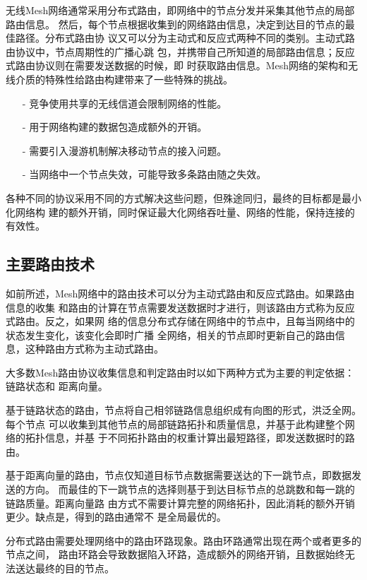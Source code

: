 无线Mesh网络通常采用分布式路由，即网络中的节点分发并采集其他节点的局部路由信息。
然后，每个节点根据收集到的网络路由信息，决定到达目的节点的最佳路径。分布式路由协
议又可以分为主动式和反应式两种不同的类别。主动式路由协议中，节点周期性的广播心跳
包，并携带自己所知道的局部路由信息；反应式路由协议则在需要发送数据的时候，即
时获取路由信息。Mesh网络的架构和无线介质的特殊性给路由构建带来了一些特殊的挑战。

\begin{itemize}
  \item[-] 竞争使用共享的无线信道会限制网络的性能。
  \item[-] 用于网络构建的数据包造成额外的开销。
  \item[-] 需要引入漫游机制解决移动节点的接入问题。
  \item[-] 当网络中一个节点失效，可能导致多条路由随之失效。
\end{itemize}

各种不同的协议采用不同的方式解决这些问题，但殊途同归，最终的目标都是最小化网络构
建的额外开销，同时保证最大化网络吞吐量、网络的性能，保持连接的有效性。

\subsection{主要路由技术}
\label{sec:2.2}
如前所述，Mesh网络中的路由技术可以分为主动式路由和反应式路由。如果路由信息的收集
和路由的计算在节点需要发送数据时才进行，则该路由方式称为反应式路由。反之，如果网
络的信息分布式存储在网络中的节点中，且每当网络中的状态发生变化，该变化会即时广播
全网络，相关的节点即时更新自己的路由信息，这种路由方式称为主动式路由。

大多数Mesh路由协议收集信息和判定路由时以如下两种方式为主要的判定依据：链路状态和
距离向量。

基于链路状态的路由，节点将自己相邻链路信息组织成有向图的形式，洪泛全网。每个节点
可以收集到其他节点的局部链路拓扑和质量信息，并基于此构建整个网络的拓扑信息，并基
于不同拓扑路由的权重计算出最短路径，即发送数据时的路由。

基于距离向量的路由，节点仅知道目标节点数据需要送达的下一跳节点，即数据发送的方向。
而最佳的下一跳节点的选择则基于到达目标节点的总跳数和每一跳的链路质量。距离向量路
由方式不需要计算完整的网络拓扑，因此消耗的额外开销更少。缺点是，得到的路由通常不
是全局最优的。

分布式路由需要处理网络中的路由环路现象。路由环路通常出现在两个或者更多的节点之间，
路由环路会导致数据陷入环路，造成额外的网络开销，且数据始终无法送达最终的目的节点。

